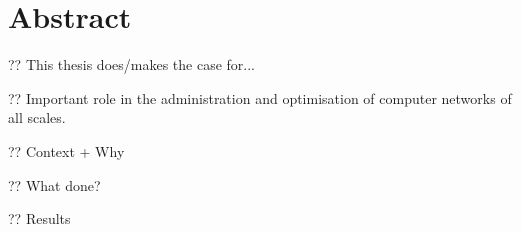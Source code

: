 \chapter*{Abstract}

?? This thesis does/makes the case for...

?? Important role in the administration and optimisation of computer networks of all scales.

?? Context + Why

?? What done?

?? Results


